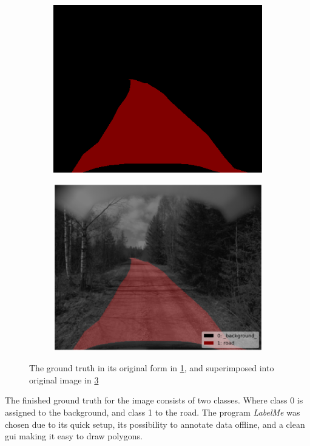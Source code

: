 \documentclass[USenglish]{ifimaster}  %
\begin{document}
\begin{figure}[ht]
\begin{subfigure}{.6\textwidth}
\includegraphics[width=.6\linewidth]{bilder/label_method.png}
\label{fig:gt_method}
\end{subfigure}
\hspace*{\fill} %
\begin{subfigure}{.6\textwidth}
\includegraphics[width=.6\linewidth]{bilder/label_viz_method.png}
\label{fig:superimposed_method}
\end{subfigure}
\caption{The ground truth in its original form in \cref{fig:gt_method}, and superimposed into original image in \cref{fig:superimposed_method}}
\end{figure}

The finished ground truth for the image consists of two classes. Where class 0 is assigned to the background, and class 1 to the road. The program \textit{LabelMe} was chosen due to its quick setup, its possibility to annotate data offline, and a clean \ac{gui} making it easy to draw polygons. 
 
\end{document}

